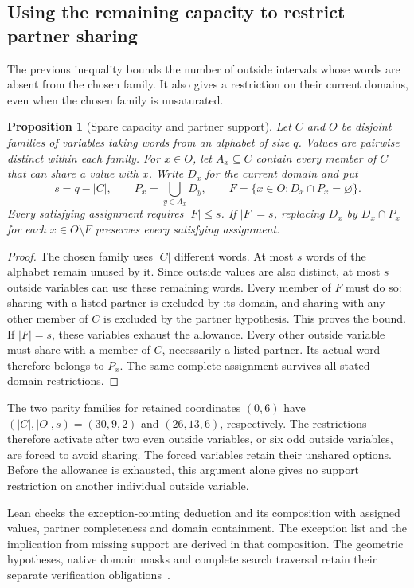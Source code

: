 \documentclass[11pt,a4paper]{article}
\newtheorem{proposition}[theorem]{Proposition}
\theoremstyle{definition}
\theoremstyle{remark}
\begin{document}
\subsection{Using the remaining capacity to restrict partner sharing}
\label{sec:spare212}
The previous inequality bounds the number of outside intervals whose
words are absent from the chosen family. It also gives a restriction
on their current domains, even when the chosen family is unsaturated.

\begin{proposition}[Spare capacity and partner support]\label{prop:spare212}
Let $C$ and $O$ be disjoint families of variables taking words from an
alphabet of size $q$. Values are pairwise distinct within each family.
For $x\in O$, let $A_x\subseteq C$ contain every member of $C$ that
can share a value with $x$. Write $D_x$ for the current domain and put
\[
s=q-|C|,\qquad P_x=\bigcup_{y\in A_x}D_y,\qquad
F=\{x\in O:D_x\cap P_x=\varnothing\}.
\]
Every satisfying assignment requires $|F|\le s$. If $|F|=s$, replacing
$D_x$ by $D_x\cap P_x$ for each $x\in O\setminus F$ preserves every
satisfying assignment.
\end{proposition}
\begin{proof}
The chosen family uses $|C|$ different words. At most $s$ words of the
alphabet remain unused by it. Since outside values are also distinct,
at most $s$ outside variables can use these remaining words. Every
member of $F$ must do so: sharing with a listed partner is excluded by
its domain, and sharing with any other member of $C$ is excluded by
the partner hypothesis. This proves the bound. If $|F|=s$, these
variables exhaust the allowance. Every other outside variable must
share with a member of $C$, necessarily a listed partner. Its actual
word therefore belongs to $P_x$. The same complete assignment
survives all stated domain restrictions.
\end{proof}

The two parity families for retained coordinates $(0,6)$ have
$(|C|,|O|,s)=(30,9,2)$ and $(26,13,6)$, respectively.
The restrictions therefore activate after two even outside variables,
or six odd outside variables, are forced to avoid sharing.
The forced variables retain their unshared options.
Before the allowance is exhausted, this argument alone gives no
support restriction on another individual outside variable.

Lean checks the exception-counting deduction and its composition with
assigned values, partner completeness and domain containment. The
exception list and the implication from missing support are derived
in that composition. The geometric hypotheses, native domain masks
and complete search traversal retain their separate verification
obligations~\cite{research212}.
\end{document}
